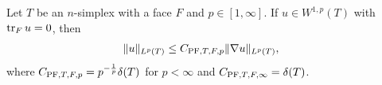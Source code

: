 \documentclass[10pt,a4paper]{article}
\begin{document}
\begin{lemma}\label{lemma:mixedbconsimplex}
    Let $T$ be an $n$-simplex with a face $F$ and $p \in [1,\infty]$. 
    If $u \in W^{1,p}(T)$ with $\operatorname{tr}_{F} u = 0$, then 
    \begin{align*}
        \| u \|_{L^{p}(T)}
        &
        \leq 
        C_{{\rm PF},T,F,p} \| \nabla u \|_{L^{p}(T)}
        ,
    \end{align*}
    where $C_{{\rm PF},T,F,p} = p^{-\frac 1 p} {\delta}(T)$ for $p < \infty$ and $C_{{\rm PF},T,F,\infty} = {\delta}(T)$. 
\end{lemma}
\end{document}
